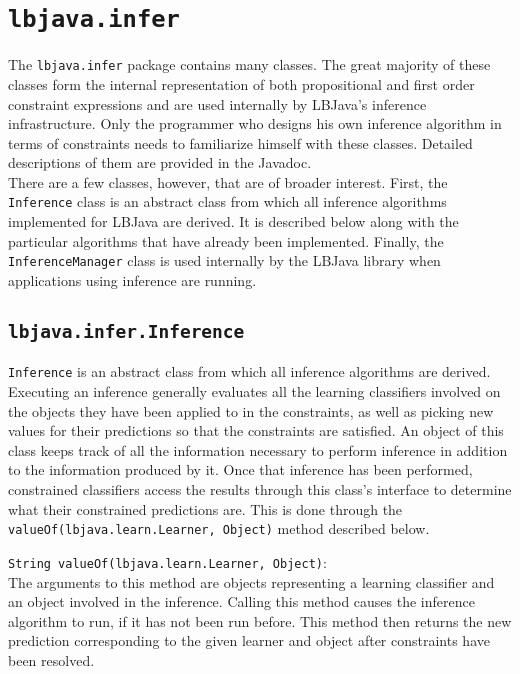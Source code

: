 \section{{\tt lbjava.infer}}

The {\tt lbjava.infer} package contains many classes.  The great majority of
these classes form the internal representation of both propositional and first
order constraint expressions and are used internally by LBJava's inference
infrastructure.  Only the programmer who designs his own inference algorithm
in terms of constraints needs to familiarize himself with these classes.
Detailed descriptions of them are provided in the Javadoc. \\

There are a few classes, however, that are of broader interest.  First, the
{\tt Inference} class is an abstract class from which all inference algorithms
implemented for LBJava are derived.  It is described below along with the
particular algorithms that have already been implemented.  Finally, the {\tt
InferenceManager} class is used internally by the LBJava library when
applications using inference are running.

\subsection{{\tt lbjava.infer.Inference}}

{\tt Inference} is an abstract class from which all inference algorithms are
derived.  Executing an inference generally evaluates all the learning
classifiers involved on the objects they have been applied to in the
constraints, as well as picking new values for their predictions so that the
constraints are satisfied.  An object of this class keeps track of all the
information necessary to perform inference in addition to the information
produced by it.  Once that inference has been performed, constrained
classifiers access the results through this class's interface to determine
what their constrained predictions are.  This is done through the {\tt
valueOf(lbjava.learn.Learner, Object)} method described below.

\begin{list}{}{}
\item[{\tt String valueOf(lbjava.learn.Learner, Object)}:] ~\\
The arguments to this method are objects representing a learning classifier
and an object involved in the inference.  Calling this method causes the
inference algorithm to run, if it has not been run before.  This method then
returns the new prediction corresponding to the given learner and object after
constraints have been resolved.
\end{list}

